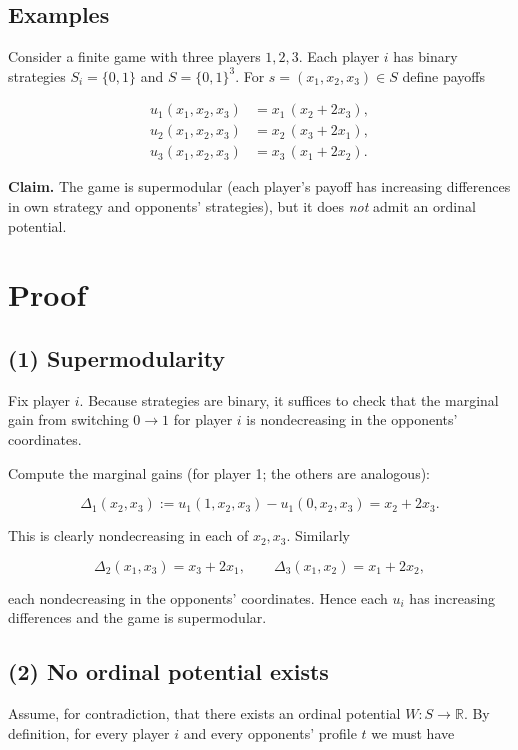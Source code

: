 \documentclass[11pt]{article}
\begin{document}
\subsection*{Examples}
Consider a finite game with three players $1,2,3$. Each player $i$ has binary strategies $S_i=\{0,1\}$ and $S=\{0,1\}^3$. For $s=(x_1,x_2,x_3)\in S$ define payoffs


\[
\begin{aligned}
u_1(x_1,x_2,x_3) &= x_1\,(x_2 + 2x_3),\\
u_2(x_1,x_2,x_3) &= x_2\,(x_3 + 2x_1),\\
u_3(x_1,x_2,x_3) &= x_3\,(x_1 + 2x_2).
\end{aligned}
\]



\medskip

\noindent\textbf{Claim.} The game is supermodular (each player's payoff has increasing differences in own strategy and opponents' strategies), but it does \emph{not} admit an ordinal potential.

\section*{Proof}

\subsection*{(1) Supermodularity}
Fix player \(i\). Because strategies are binary, it suffices to check that the marginal gain from switching \(0\to1\) for player \(i\) is nondecreasing in the opponents' coordinates.

Compute the marginal gains (for player 1; the others are analogous):


\[
\Delta_1(x_2,x_3):=u_1(1,x_2,x_3)-u_1(0,x_2,x_3)=x_2+2x_3.
\]


This is clearly nondecreasing in each of \(x_2,x_3\). Similarly


\[
\Delta_2(x_1,x_3)=x_3+2x_1,\qquad
\Delta_3(x_1,x_2)=x_1+2x_2,
\]


each nondecreasing in the opponents' coordinates. Hence each $u_i$ has increasing differences and the game is supermodular.

\subsection*{(2) No ordinal potential exists}
Assume, for contradiction, that there exists an ordinal potential \(W:S\to\mathbb R\). By definition, for every player \(i\) and every opponents' profile \(t\) we must have
\end{document}
